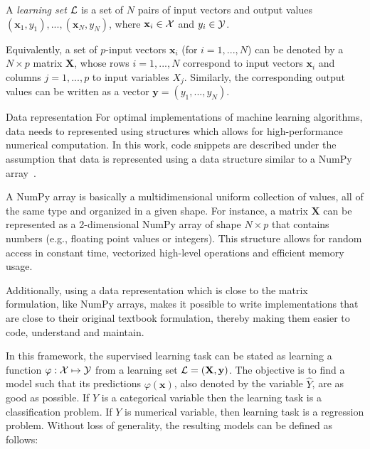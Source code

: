 \begin{definition}
A \emph{learning set} ${\cal L}$\label{ntn:learning-set} is a set of $N$\label{ntn:N}
pairs of input vectors and output values $(\mathbf{x}_1, y_1), ...,
(\mathbf{x}_N, y_N)$, where $\mathbf{x}_i \in {\cal X}$ and $y_i \in {\cal Y}$.
\end{definition}

Equivalently, a set of $p$-input vectors $\mathbf{x}_i$\label{ntn:sample-x_i} (for $i=1, ..., N$) can
be denoted by a $N\times p$ matrix $\mathbf{X}$\label{ntn:matrix-X}, whose rows $i=1, ..., N$
correspond to input vectors $\mathbf{x}_i$ and columns $j=1, ..., p$ to input
variables $X_j$. Similarly, the corresponding output values can be written as a
vector $\mathbf{y}=(y_1, ..., y_N)$\label{ntn:vector-y}.

\begin{remark}{Data representation}
For optimal implementations of machine learning algorithms, data needs to
represented using structures which allows for high-performance numerical
computation. In this work, code snippets are described under  the assumption
that data is represented using a data structure similar to a NumPy
array~\citep{vanderwalt:2011}.

A NumPy array is basically a multidimensional uniform collection of values, all
of the same type and organized in a given shape. For instance, a matrix
$\mathbf{X}$ can be represented as a 2-dimensional NumPy array of shape $N
\times p$ that contains numbers (e.g., floating point values or integers). This
structure allows for random access in constant time, vectorized high-level
operations and efficient memory usage.

Additionally, using a data representation which is close to the matrix
formulation, like NumPy arrays, makes it possible to write implementations that
are close to their original textbook formulation, thereby making them easier to code,
understand and maintain. \end{remark}

In this framework, the supervised learning task can be stated as learning a
function $\varphi: {\cal X} \mapsto {\cal Y}$\label{ntn:varphi} from a learning set ${\cal
L}=(\mathbf{X}, \mathbf{y})$. The objective is
to find a model such that its predictions $\varphi(\mathbf{x})$\label{ntn:varphi-x}, also denoted
by the variable $\hat{Y}$, are as good as possible. If $Y$ is a categorical
variable then the learning task is a classification problem. If $Y$ is
numerical variable, then learning task is a regression problem. Without loss of
generality, the resulting models can be defined as
follows:

